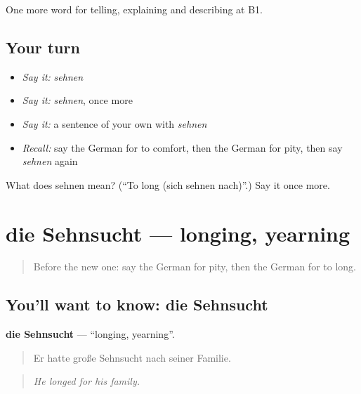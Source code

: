 \begin{grammarlens}[title={What you've built}]
One more word for telling, explaining and describing at B1.
\end{grammarlens}

\subsection*{Your turn}
\begin{itemize}
\raggedright
  \item \emph{Say it:} \emph{sehnen}
  \item \emph{Say it:} \emph{sehnen}, once more
  \item \emph{Say it:} a sentence of your own with \emph{sehnen}
  \item \emph{Recall:} say the German for to comfort, then the German for pity, then say \emph{sehnen} again
\end{itemize}

\begin{tcolorbox}[breakable,colback=teal!4,colframe=teal!35!black,title={Before you move on}]
What does sehnen mean? (\textquotedblleft{}To long (sich sehnen nach)\textquotedblright{}.) Say it once more.
\end{tcolorbox}
\section[die Sehnsucht]{die Sehnsucht — longing, yearning}

\label{lesson:GE-C472-sehnsucht}



\begin{quote}
Before the new one: say the German for pity, then the German for to long.
\end{quote}

\subsection*{You'll want to know: die Sehnsucht}
\textbf{die Sehnsucht} — \textquotedblleft{}longing, yearning\textquotedblright{}.

\begin{quote}
Er hatte große Sehnsucht nach seiner Familie.
\end{quote}

\begin{quote}
\emph{He longed for his family.}
\end{quote}

